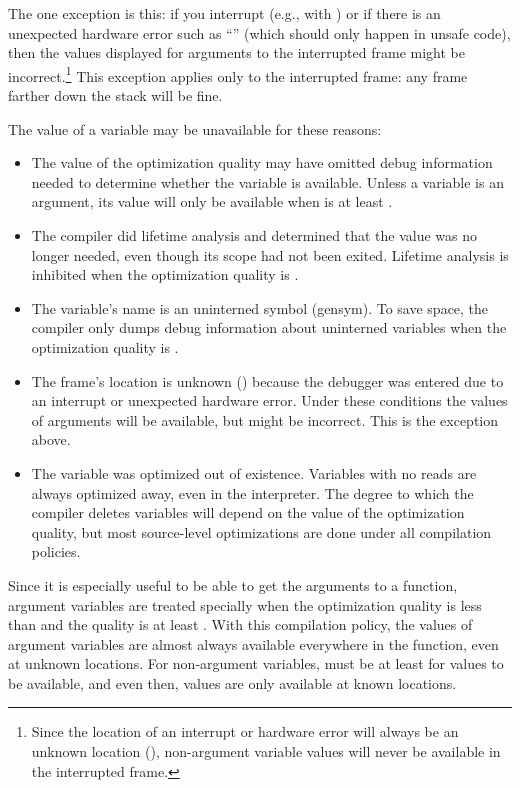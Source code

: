 The one exception is this: if you interrupt (e.g., with ) or if there is
an unexpected hardware error such as ``'' (which should only happen
in unsafe code), then the values displayed for arguments to the interrupted
frame might be incorrect.\footnote{Since the location of an interrupt or hardware
error will always be an unknown location (),
non-argument variable values will never be available in the interrupted frame.}
This exception applies only to the interrupted frame: any frame farther down
the stack will be fine.

The value of a variable may be unavailable for these reasons:
\begin{itemize}

\item
The value of the  optimization quality may have omitted debug
information needed to determine whether the variable is available.
Unless a variable is an argument, its value will only be available when
 is at least .

\item
The compiler did lifetime analysis and determined that the value was no longer
needed, even though its scope had not been exited.  Lifetime analysis is
inhibited when the  optimization quality is .

\item
The variable's name is an uninterned symbol (gensym).  To save space, the
compiler only dumps debug information about uninterned variables when the
 optimization quality is .

\item
The frame's location is unknown () because
the debugger was entered due to an interrupt or unexpected hardware error.
Under these conditions the values of arguments will be available, but might be
incorrect.  This is the exception above.

\item
The variable was optimized out of existence.  Variables with no reads are
always optimized away, even in the interpreter.  The degree to which the
compiler deletes variables will depend on the value of the 
optimization quality, but most source-level optimizations are done under all
compilation policies.
\end{itemize}


Since it is especially useful to be able to get the arguments to a function,
argument variables are treated specially when the  optimization
quality is less than  and the  quality is at least .
With this compilation policy, the values of argument variables are almost
always available everywhere in the function, even at unknown locations.  For
non-argument variables,  must be at least  for values to be
available, and even then, values are only available at known locations.


